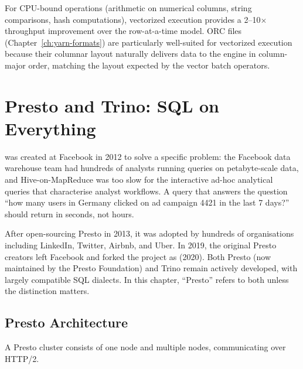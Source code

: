 For CPU-bound operations (arithmetic on numerical columns, string
comparisons, hash computations), vectorized execution provides a
2--10$\times$ throughput improvement over the row-at-a-time model.
ORC files (Chapter~\ref{ch:yarn-formats}) are particularly well-suited
for vectorized execution because their columnar layout naturally delivers
data to the engine in column-major order, matching the layout expected
by the vector batch operators.

\section{Presto and Trino: SQL on Everything}
\label{sec:presto}

 was created at Facebook in 2012 to solve a specific problem:
the Facebook data warehouse team had hundreds of analysts running queries
on petabyte-scale data, and Hive-on-MapReduce was too slow for the
interactive ad-hoc analytical queries that characterise analyst workflows.
A query that answers the question ``how many users in Germany clicked on
ad campaign 4421 in the last 7 days?'' should return in seconds, not hours.

After open-sourcing Presto in 2013, it was adopted by hundreds of
organisations including LinkedIn, Twitter, Airbnb, and Uber.
In 2019, the original Presto creators left Facebook and forked the project
as  (2020). Both Presto (now maintained by the Presto
Foundation) and Trino remain actively developed, with largely compatible
SQL dialects. In this chapter, ``Presto'' refers to both unless the
distinction matters.

\parencite{Presto2019}

\subsection{Presto Architecture}
\label{subsec:presto-arch}

A Presto cluster consists of one  node and multiple
 nodes, communicating over HTTP/2.

